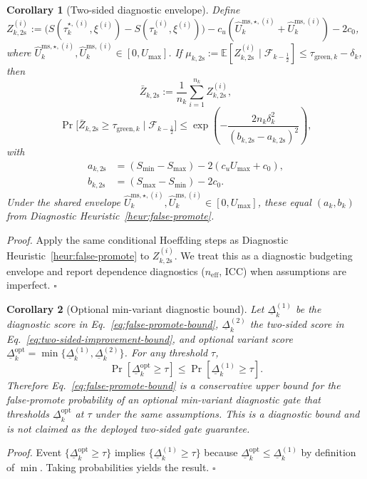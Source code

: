 \documentclass[letterpaper,10pt,conference]{ieeeconf}
\newtheorem{corollary}{Corollary}
\begin{document}
\begin{corollary}[Two-sided diagnostic envelope]
\label{cor:two-sided-envelope}
Define \(Z_{k,\mathrm{2s}}^{(i)}:=\big(S(\tau_k^{\star,(i)},\xi^{(i)})-S(\tau_k^{(i)},\xi^{(i)})\big)-c_u(\widehat{U}^{\mathrm{ms},\star,(i)}_k+\widehat{U}^{\mathrm{ms},(i)}_k)-2c_0\), where \(\widehat{U}^{\mathrm{ms},\star,(i)}_k,\widehat{U}^{\mathrm{ms},(i)}_k\in[0,U_{\max}]\). If \(\mu_{k,\mathrm{2s}}:=\mathbb{E}[Z_{k,\mathrm{2s}}^{(i)}\mid\mathcal{F}_{k-\frac{1}{2}}]\le\tau_{\text{green},k}-\delta_k\), then
\[
\bar{Z}_{k,\mathrm{2s}}:=\frac{1}{n_k}\sum_{i=1}^{n_k} Z_{k,\mathrm{2s}}^{(i)},
\]
\[
\Pr\!\big[\bar{Z}_{k,\mathrm{2s}}\ge\tau_{\text{green},k}\mid\mathcal{F}_{k-\frac{1}{2}}\big]
\le
\exp\!\left(-\frac{2n_k\delta_k^2}{(b_{k,\mathrm{2s}}-a_{k,\mathrm{2s}})^2}\right),
\]
with
\[
\begin{aligned}
a_{k,\mathrm{2s}} &= (S_{\min}-S_{\max})-2(c_uU_{\max}+c_0),\\
b_{k,\mathrm{2s}} &= (S_{\max}-S_{\min})-2c_0.
\end{aligned}
\]
Under the shared envelope \(\widehat{U}^{\mathrm{ms},\star,(i)}_k,\widehat{U}^{\mathrm{ms},(i)}_k\in[0,U_{\max}]\), these equal \((a_k,b_k)\) from Diagnostic Heuristic~\ref{heur:false-promote}.
\end{corollary}
\noindent\textit{Proof.}
Apply the same conditional Hoeffding steps as Diagnostic Heuristic~\ref{heur:false-promote} to \(Z_{k,\mathrm{2s}}^{(i)}\). We treat this as a diagnostic budgeting envelope and report dependence diagnostics (\(n_{\mathrm{eff}}\), ICC) when assumptions are imperfect.
\hfill$\square$

\begin{corollary}[Optional min-variant diagnostic bound]
\label{cor:min-variant-bound}
Let $\underline{\Delta}_k^{(1)}$ be the diagnostic score in Eq.~\ref{eq:false-promote-bound}, $\underline{\Delta}_k^{(2)}$ the two-sided score in Eq.~\ref{eq:two-sided-improvement-bound}, and optional variant score $\underline{\Delta}_k^{\mathrm{opt}}=\min\{\underline{\Delta}_k^{(1)},\underline{\Delta}_k^{(2)}\}$. For any threshold $\tau$,
\[
\Pr[\underline{\Delta}_k^{\mathrm{opt}}\ge\tau]\le \Pr[\underline{\Delta}_k^{(1)}\ge\tau].
\]
Therefore Eq.~\ref{eq:false-promote-bound} is a conservative upper bound for the false-promote probability of an optional min-variant diagnostic gate that thresholds $\underline{\Delta}_k^{\mathrm{opt}}$ at $\tau$ under the same assumptions. This is a diagnostic bound and is not claimed as the deployed two-sided gate guarantee.
\end{corollary}
\noindent\textit{Proof.}
Event $\{\underline{\Delta}_k^{\mathrm{opt}}\ge\tau\}$ implies $\{\underline{\Delta}_k^{(1)}\ge\tau\}$ because $\underline{\Delta}_k^{\mathrm{opt}}\le \underline{\Delta}_k^{(1)}$ by definition of $\min$. Taking probabilities yields the result.
\hfill$\square$
\end{document}
